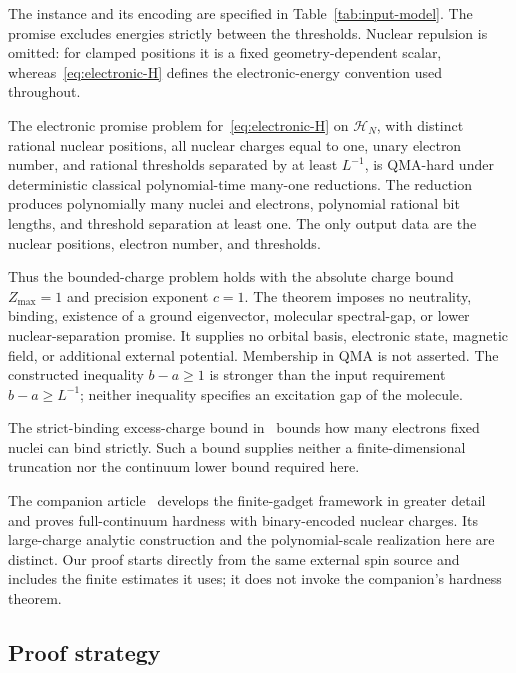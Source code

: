 The instance and its encoding are specified in Table~\ref{tab:input-model}.
The promise excludes energies strictly between the thresholds. Nuclear
repulsion is omitted: for clamped positions it is a fixed
geometry-dependent scalar, whereas~\eqref{eq:electronic-H} defines the
electronic-energy convention used throughout.

\begin{theorem}\label{thm:main}
The electronic promise problem for~\eqref{eq:electronic-H} on
$\mathcal H_N$, with distinct rational nuclear positions, all nuclear
charges equal to one, unary electron number, and rational thresholds
separated by at least $L^{-1}$, is QMA-hard under deterministic classical
polynomial-time many-one reductions. The reduction produces
polynomially many nuclei and electrons, polynomial rational bit lengths,
and threshold separation at least one. The only output data are the
nuclear positions, electron number, and thresholds.
\end{theorem}

Thus the bounded-charge problem holds with the absolute charge bound
$Z_{\max}=1$ and precision exponent $c=1$. The theorem imposes no
neutrality, binding, existence of a ground eigenvector, molecular
spectral-gap, or lower nuclear-separation promise. It supplies no orbital
basis, electronic state, magnetic field, or additional external
potential. Membership in QMA is not asserted. The constructed inequality
$b-a\ge1$ is stronger than the input requirement $b-a\ge L^{-1}$; neither
inequality specifies an excitation gap of the molecule.

The strict-binding excess-charge bound
in~\cite[Theorem 1.1]{OpenAIIonization2026} bounds how many electrons
fixed nuclei can bind strictly. Such a bound supplies neither
a finite-dimensional truncation nor the continuum lower bound required
here.

The companion article~\cite[Theorem 1.1 and Section 2]{OpenAIBinary2026} develops the
finite-gadget framework in greater detail and proves full-continuum
hardness with binary-encoded nuclear charges. Its large-charge analytic
construction and the polynomial-scale realization here are distinct.
Our proof starts directly from the same external spin source and
includes the finite estimates it uses; it does not invoke the companion's
hardness theorem.

\subsection{Proof strategy}

